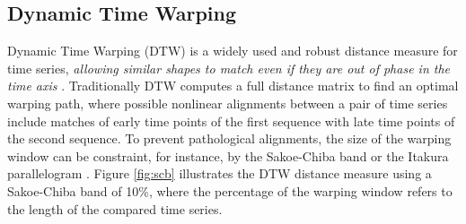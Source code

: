 \subsection{Dynamic Time Warping} \label{dynamic_time_warping}

Dynamic Time Warping (DTW) is a widely used and robust distance measure for time series, \textit{allowing similar shapes to match even if they are out of phase in the time axis} \cite{keogh2002exact}. Traditionally DTW computes a full distance matrix to find an optimal warping path, where possible nonlinear alignments between a pair of time series include matches of early time points of the first sequence with late time points of the second sequence. To prevent pathological alignments, the size of the warping window can be constraint, for instance, by the Sakoe-Chiba band \cite{sakoe1978dynamic} or the Itakura parallelogram \cite{itakura1975minimum}. Figure \ref{fig:scb} illustrates the DTW distance measure using a Sakoe-Chiba band of 10\%, where the percentage of the warping window refers to the length of the compared time series.

